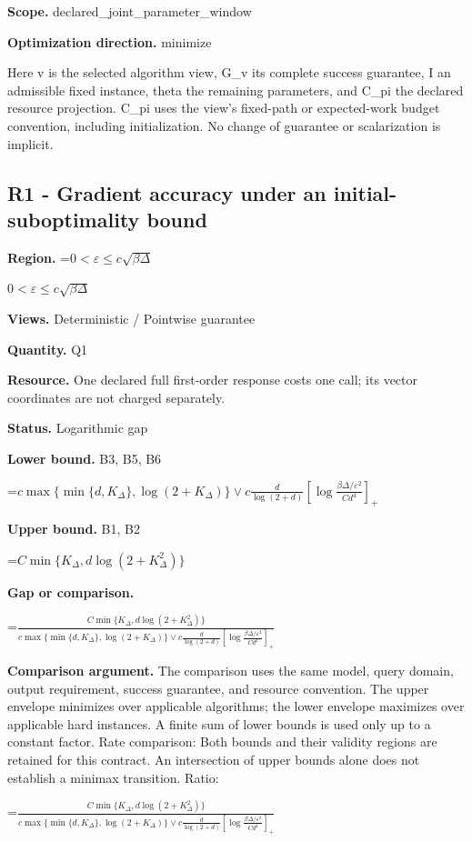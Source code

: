 \documentclass[10pt,a4paper]{article}
\newcommand{\AtlasMath}[1]{\par\begingroup\centering\setbox0=\hbox{$\displaystyle #1$}\ifdim\wd0>1.4\linewidth\typeout{ATLAS WIDE FORMULA: \the\wd0}\fi\ifdim\wd0>\linewidth\resizebox{\linewidth}{!}{\box0}\else\box0\fi\par\endgroup}
\newcommand{\AtlasInlineMath}[1]{\begingroup\setbox0=\hbox{$#1$}\ifdim\wd0>.4\linewidth\endgroup\AtlasMath{#1}\else\endgroup$#1$\fi}
\begin{document}
\textbf{Scope.} declared\_joint\_parameter\_window

\textbf{Optimization direction.} minimize

Here v is the selected algorithm view, G\_v its complete success guarantee, I an admissible fixed instance, theta the remaining parameters, and C\_pi the declared resource projection. C\_pi uses the view's fixed-path or expected-work budget convention, including initialization. No change of guarantee or scalarization is implicit.

\subsection{R1 - Gradient accuracy under an initial-suboptimality bound}
\textbf{Region.} \AtlasInlineMath{0<\varepsilon\le c\sqrt{\beta\Delta}}

\textbf{Views.} Deterministic / Pointwise guarantee

\textbf{Quantity.} Q1

\textbf{Resource.} One declared full first-order response costs one call; its vector coordinates are not charged separately.

\textbf{Status.} Logarithmic gap

\textbf{Lower bound.} B3, B5, B6

\AtlasMath{c\max\{\min\{d,K_\Delta\},\log(2+K_\Delta)\}\vee c\frac d{\log(2+d)}\left[\log\frac{\beta\Delta/\varepsilon^2}{Cd^{4}}\right]_+}
\textbf{Upper bound.} B1, B2

\AtlasMath{C\min\{K_\Delta,d\log(2+K_\Delta^2)\}}
\textbf{Gap or comparison.} 
\AtlasMath{\frac{C\min\{K_\Delta,d\log(2+K_\Delta^2)\}}{c\max\{\min\{d,K_\Delta\},\log(2+K_\Delta)\}\vee c\frac d{\log(2+d)}\left[\log\frac{\beta\Delta/\varepsilon^2}{Cd^{4}}\right]_+}}


\textbf{Comparison argument.} The comparison uses the same model, query domain, output requirement, success guarantee, and resource convention. The upper envelope minimizes over applicable algorithms; the lower envelope maximizes over applicable hard instances. A finite sum of lower bounds is used only up to a constant factor. Rate comparison: Both bounds and their validity regions are retained for this contract. An intersection of upper bounds alone does not establish a minimax transition. Ratio: 
\AtlasMath{\frac{C\min\{K_\Delta,d\log(2+K_\Delta^2)\}}{c\max\{\min\{d,K_\Delta\},\log(2+K_\Delta)\}\vee c\frac d{\log(2+d)}\left[\log\frac{\beta\Delta/\varepsilon^2}{Cd^{4}}\right]_+}}
\end{document}
